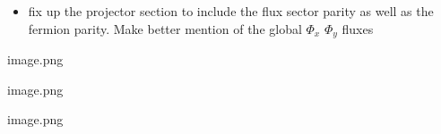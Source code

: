 \begin{itemize}
\tightlist
\item
  fix up the projector section to include the flux sector parity as well
  as the fermion parity. Make better mention of the global \(\Phi_x\)
  \(\Phi_y\) fluxes
\end{itemize}

{image.png}

{image.png}

{image.png}

\begin{Shaded}
\begin{Highlighting}[]

\end{Highlighting}
\end{Shaded}
